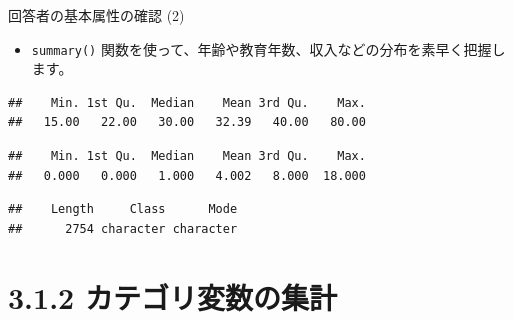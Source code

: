 \documentclass[
  ignorenonframetext,
]{beamer}
\newenvironment{Shaded}{\begin{snugshade}}{\end{snugshade}}
\newcommand{\CommentTok}[1]{\textcolor[rgb]{0.56,0.35,0.01}{\textit{#1}}}
\newcommand{\FunctionTok}[1]{\textcolor[rgb]{0.00,0.00,0.00}{#1}}
\newcommand{\NormalTok}[1]{#1}
\newcommand{\SpecialCharTok}[1]{\textcolor[rgb]{0.00,0.00,0.00}{#1}}
\providecommand{\tightlist}{%
  \setlength{\itemsep}{0pt}\setlength{\parskip}{0pt}}
\begin{document}
\begin{frame}[fragile]{回答者の基本属性の確認 (2)}
\protect\hypertarget{ux56deux7b54ux8005ux306eux57faux672cux5c5eux6027ux306eux78baux8a8d-2}{}
\begin{itemize}
\tightlist
\item
  \texttt{summary()}
  関数を使って、年齢や教育年数、収入などの分布を素早く把握します。
\end{itemize}

\scriptsize

\begin{Shaded}
\end{Shaded}

\begin{verbatim}
##    Min. 1st Qu.  Median    Mean 3rd Qu.    Max. 
##   15.00   22.00   30.00   32.39   40.00   80.00
\end{verbatim}

\begin{Shaded}
\end{Shaded}

\begin{verbatim}
##    Min. 1st Qu.  Median    Mean 3rd Qu.    Max. 
##   0.000   0.000   1.000   4.002   8.000  18.000
\end{verbatim}

\begin{Shaded}
\end{Shaded}

\begin{verbatim}
##    Length     Class      Mode 
##      2754 character character
\end{verbatim}

\normalsize
\end{frame}

\hypertarget{ux30abux30c6ux30b4ux30eaux5909ux6570ux306eux96c6ux8a08}{%
\section{3.1.2
カテゴリ変数の集計}\label{ux30abux30c6ux30b4ux30eaux5909ux6570ux306eux96c6ux8a08}}
\end{document}
